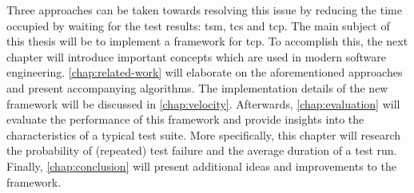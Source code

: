 \noindent Three approaches can be taken towards resolving this issue by reducing the time occupied by waiting for the test results: \acrfull{tsm}, \acrfull{tcs} and \acrfull{tcp}. The main subject of this thesis will be to implement a framework for \acrshort{tcp}. To accomplish this, the next chapter will introduce important concepts which are used in modern software engineering. \autoref{chap:related-work} will elaborate on the aforementioned approaches and present accompanying algorithms. The implementation details of the new framework will be discussed in \autoref{chap:velocity}. Afterwards, \autoref{chap:evaluation} will evaluate the performance of this framework and provide insights into the characteristics of a typical test suite. More specifically, this chapter will research the probability of (repeated) test failure and the average duration of a test run. Finally, \autoref{chap:conclusion} will present additional ideas and improvements to the framework.